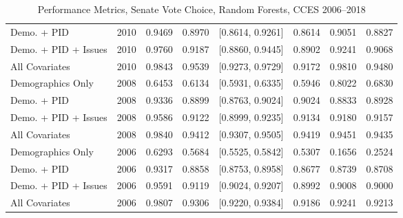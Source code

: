 \begin{table}[ht]
\begin{tabular}{lrrrlrrr}
  Demo. + PID & 2010 & 0.9469 & 0.8970 & [0.8614, 0.9261] & 0.8614 & 0.9051 & 0.8827 \\ 
  Demo. + PID + Issues & 2010 & 0.9760 & 0.9187 & [0.8860, 0.9445] & 0.8902 & 0.9241 & 0.9068 \\ 
  All Covariates & 2010 & 0.9843 & 0.9539 & [0.9273, 0.9729] & 0.9172 & 0.9810 & 0.9480 \\ 
  Demographics Only & 2008 & 0.6453 & 0.6134 & [0.5931, 0.6335] & 0.5946 & 0.8022 & 0.6830 \\ 
  Demo. + PID & 2008 & 0.9336 & 0.8899 & [0.8763, 0.9024] & 0.9024 & 0.8833 & 0.8928 \\ 
  Demo. + PID + Issues & 2008 & 0.9586 & 0.9122 & [0.8999, 0.9235] & 0.9134 & 0.9180 & 0.9157 \\ 
  All Covariates & 2008 & 0.9840 & 0.9412 & [0.9307, 0.9505] & 0.9419 & 0.9451 & 0.9435 \\ 
  Demographics Only & 2006 & 0.6293 & 0.5684 & [0.5525, 0.5842] & 0.5307 & 0.1656 & 0.2524 \\ 
  Demo. + PID & 2006 & 0.9317 & 0.8858 & [0.8753, 0.8958] & 0.8677 & 0.8739 & 0.8708 \\ 
  Demo. + PID + Issues & 2006 & 0.9591 & 0.9119 & [0.9024, 0.9207] & 0.8992 & 0.9008 & 0.9000 \\ 
  All Covariates & 2006 & 0.9807 & 0.9306 & [0.9220, 0.9384] & 0.9186 & 0.9241 & 0.9213 \\ 
   \bottomrule
\end{tabular}
\caption{Performance Metrics, Senate Vote Choice, Random Forests, CCES 2006--2018} 
\label{tab:cces_senate_rf}
\end{table}
